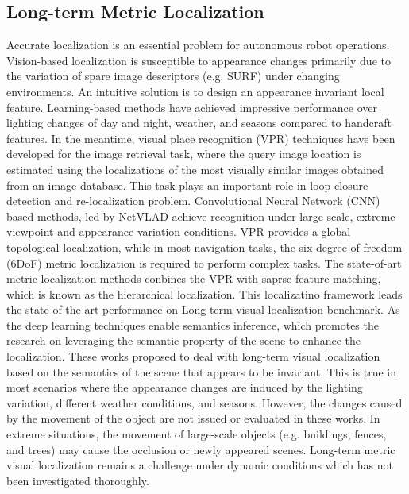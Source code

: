 \subsection{Long-term Metric Localization}
Accurate localization is an essential problem for autonomous robot operations. Vision-based localization is susceptible to appearance changes primarily due to the variation of spare image descriptors (e.g. SURF\cite{bay2008speeded}) under changing environments. An intuitive solution is to design an appearance invariant local feature. Learning-based methods have achieved impressive performance\cite{detone2018superpoint,revaud2019r2d2,sun2021robust,gridseth2021keeping} over lighting changes of day and night, weather, and seasons compared to handcraft features\cite{rublee2011orb,bay2008speeded}. In the meantime, visual place recognition (VPR) techniques have been developed for the image retrieval task, where the query image location is estimated using the localizations of the most visually similar images obtained from an image database. This task plays an important role in loop closure detection and re-localization problem. Convolutional Neural Network (CNN) based methods, led by NetVLAD\cite{arandjelovic2016netvlad} achieve recognition under large-scale, extreme viewpoint and appearance variation conditions. VPR provides a global topological localization, while in most navigation tasks, the six-degree-of-freedom (6DoF) metric localization is required to perform complex tasks. The state-of-art metric localization methods conbines the VPR with saprse feature matching\cite{sarlin2019coarse,germain2019sparse,sarlin20superglue}, which is known as the hierarchical localization. This localizatino framework leads the state-of-the-art performance on Long-term visual localization benchmark. As the deep learning techniques enable semantics inference, which promotes the research on leveraging the semantic property of the scene to enhance the localization\cite{larsson2019fine,stenborg2018long,taira2019right,yu2022accurate,7989305}. These works proposed to deal with long-term visual localization based on the semantics of the scene that appears to be invariant. This is true in most scenarios where the appearance changes are induced by the lighting variation, different weather conditions, and seasons. However, the changes caused by the movement of the object are not issued or evaluated in these works. In extreme situations, the movement of large-scale objects (e.g. buildings, fences, and trees) may cause the occlusion or newly appeared scenes. Long-term metric visual localization remains a challenge under dynamic conditions which has not been investigated thoroughly.

